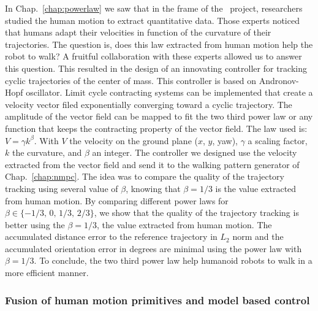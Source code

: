 In Chap.~\ref{chap:powerlaw} we saw that in the frame of the \koroibot\ project, researchers studied the human motion to extract quantitative data.
Those experts noticed that humans adapt their velocities in function of the curvature of their trajectories.
The question is, does this law extracted from human motion help the robot to walk?
A fruitful collaboration with these experts allowed us to answer this question.
This resulted in the design of an innovating controller for tracking cyclic trajectories of the center of mass.
This controller is based on Andronov-Hopf oscillator.
Limit cycle contracting systems can be implemented that create a velocity vector filed exponentially converging toward a cyclic trajectory.
The amplitude of the vector field can be mapped to fit the two third power law or any function that keeps the contracting property of the vector field.
The law used is: $V = \gamma k^\beta$.
With $V$ the velocity on the ground plane ($x$, $y$, yaw), $\gamma$ a scaling factor, $k$ the curvature, and $\beta$ an integer.
The controller we designed use the velocity extracted from the vector field and send it to the walking pattern generator of Chap.~\ref{chap:nmpc}.
The idea was to compare the quality of the trajectory tracking using several value of $\beta$, knowing that $\beta=1/3$ is the value extracted from human motion.
By comparing different power laws for $\beta \in \{-1/3,\, 0 ,\, 1/3,\, 2/3\}$, we show that the quality of the trajectory tracking is better using the $\beta=1/3$, the value extracted from human motion.
The accumulated distance error to the reference trajectory in ${L}_2$ norm and the accumulated orientation error in degrees are minimal using the power law with $\beta=1/3$.
To conclude, the two third power law help humanoid robots to walk in a more efficient manner.

\subsubsection*{Fusion of human motion primitives and model based control}

